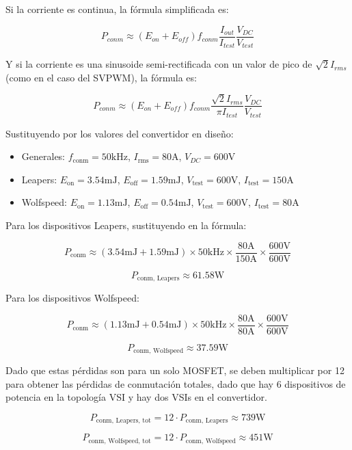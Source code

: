 Si la corriente es continua, la fórmula simplificada es:

\[
P_{conm} \approx (E_{on} + E_{off}) f_{conm} \frac{I_{out}}{I_{test}} \frac{V_{DC}}{V_{test}}
\]

Y si la corriente es una sinusoide semi-rectificada con un valor de pico de \(\sqrt{2} I_{rms}\) (como en el caso del SVPWM), la fórmula es:

\[
P_{conm} \approx (E_{on} + E_{off}) f_{conm} \frac{\sqrt{2} I_{rms}}{\pi I_{test}} \frac{V_{DC}}{V_{test}}
\]

Sustituyendo por los valores del convertidor en diseño:

\begin{itemize}
	\item Generales: \(f_{\text{conm}} = 50 \text{kHz}\), \(I_{\text{rms}} = 80 \text{A}\), \(V_{DC} = 600 \text{V}\)
	\item Leapers: \(E_{\text{on}} = 3.54 \text{mJ}\), \(E_{\text{off}} = 1.59 \text{mJ}\), \(V_{\text{test}} = 600 \text{V}\), \(I_{\text{test}} = 150 \text{A}\)
	\item Wolfspeed: \(E_{\text{on}} = 1.13 \text{mJ}\), \(E_{\text{off}} = 0.54 \text{mJ}\), \(V_{\text{test}} = 600 \text{V}\), \(I_{\text{test}} = 80 \text{A}\)
\end{itemize}

Para los dispositivos Leapers, sustituyendo en la fórmula:

\[
P_{\text{conm}} \approx (3.54 \text{mJ} + 1.59 \text{mJ}) \times 50 \text{kHz} \times \frac{80 \text{A}}{150 \text{A}} \times \frac{600 \text{V}}{600 \text{V}}
\]

\[
P_{\text{conm, Leapers}} \approx 61.58 \text{W}
\]

Para los dispositivos Wolfspeed:

\[
P_{\text{conm}} \approx (1.13 \text{mJ} + 0.54 \text{mJ}) \times 50 \text{kHz} \times \frac{80  \text{A}}{80 \text{A}} \times \frac{600 \text{V}}{600 \text{V}}
\]

\[
P_{\text{conm, Wolfspeed}} \approx 37.59 \text{W}
\]

Dado que estas pérdidas son para un solo MOSFET, se deben multiplicar por 12 para obtener las pérdidas de conmutación totales, dado que hay 6 dispositivos de potencia en la topología VSI y hay dos VSIs en el convertidor.

\[
P_{\text{conm, Leapers, tot}} = 12\cdot P_{\text{conm, Leapers}} \approx 739 \text{W}
\]

\[
P_{\text{conm, Wolfspeed, tot}} = 12\cdot P_{\text{conm, Wolfspeed}} \approx 451 \text{W}
\]

